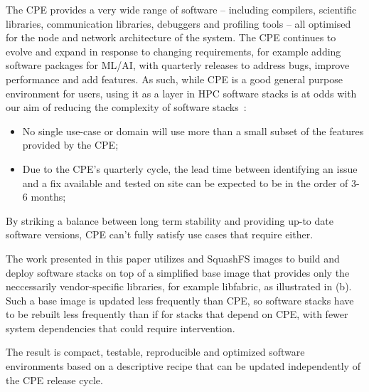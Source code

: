 The CPE provides a very wide range of software -- including compilers, scientific libraries, communication libraries, debuggers and profiling tools -- all optimised for the node and network architecture of the system.
The CPE continues to evolve and expand in response to changing requirements, for example adding software packages for ML/AI, with quarterly releases to address bugs, improve performance and add features.
As such, while CPE is a good general purpose environment for users, using it as a layer in HPC software stacks is at odds with our aim of reducing the complexity of software stacks~:
\begin{itemize}
    \item No single use-case or domain will use more than a small subset of the features provided by the CPE;
    \item Due to the CPE's quarterly cycle, the lead time between identifying an issue and a fix available and tested on site can be expected to be in the order of 3-6 months;
\end{itemize}
By striking a balance between long term stability and providing up-to date software versions, CPE can't fully satisfy use cases that require either.

The work presented in this paper utilizes \spack and SquashFS images to build and deploy software stacks on top of a simplified base image that provides only the neccessarily vendor-specific libraries, for example libfabric, as illustrated in (b).
Such a base image is updated less frequently than CPE, so software stacks have to be rebuilt less frequently than if for stacks that depend on CPE, with fewer system dependencies that could require intervention.

The result is compact, testable, reproducible and optimized software environments based on a descriptive recipe that can be updated independently of the CPE release cycle.

